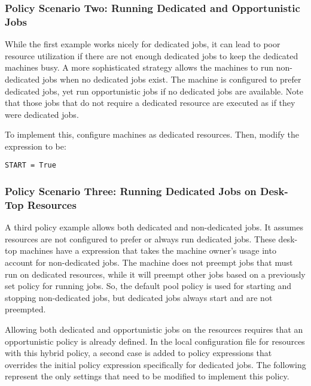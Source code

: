 \subsubsection{\label{sec:Configure-Dedicated-Ex2}
Policy Scenario Two: Running Dedicated and Opportunistic Jobs}

While the first example works nicely for dedicated jobs,
it can 
lead to poor resource utilization if there are not enough dedicated
jobs to keep the dedicated machines busy.  
A more sophisticated strategy allows 
the machines to run non-dedicated jobs when no dedicated jobs exist.
The machine is
configured to prefer dedicated jobs, yet
run opportunistic jobs if no dedicated jobs are available.
Note that those jobs that do not require a dedicated resource
are executed as if they were dedicated jobs.

To implement this,
configure machines as dedicated resources.
Then, modify the  expression to be:

\begin{verbatim}
START = True
\end{verbatim}

\subsubsection{\label{sec:Configure-Dedicated-Ex3}
Policy Scenario Three: Running Dedicated Jobs on Desk-Top Resources}

A third policy example allows both dedicated and non-dedicated
jobs.
It assumes resources are not
configured to prefer or always run dedicated jobs.
These desk-top machines have a  expression that
takes the machine owner's usage into account for non-dedicated
jobs.
The machine does not preempt jobs that must run on dedicated
resources,
while it will preempt other jobs based on a previously set
policy for running jobs.
So, the default pool policy is used for starting and
stopping non-dedicated jobs, but dedicated jobs always start 
and are not preempted.

Allowing both dedicated and opportunistic jobs on the resources
requires that an opportunistic policy is already defined.
In the local configuration file for resources with this hybrid policy,
a second case is added to policy expressions that overrides
the initial policy expression specifically for
dedicated jobs.
The following represent the only settings that need to be modified
to implement this policy. 

